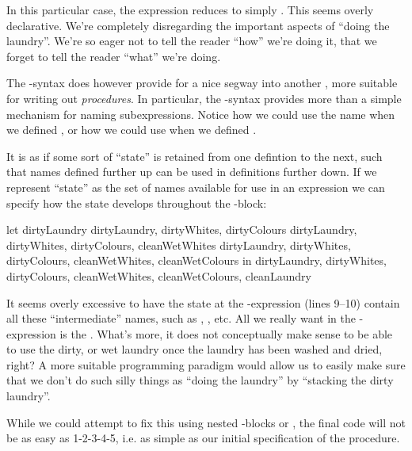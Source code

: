 In this particular case, the expression reduces to simply . This seems overly declarative. We're completely disregarding the
important aspects of ``doing the laundry''. We're so eager not to tell the
reader ``how'' we're doing it, that we forget to tell the reader ``what'' we're
doing.

The -syntax does however provide for a nice segway into another
, more suitable for writing out \emph{procedures}. In particular, the
-syntax provides more than a simple mechanism for naming
subexpressions. Notice how we could use the name  when we
defined , or how we could use  when we
defined .

It is as if some sort of ``state'' is retained from one defintion to the next,
such that names defined further up can be used in definitions further down. If
we represent ``state'' as the set of names available for use in an expression
we can specify how the state develops throughout the -block: 

\begin{code}
let
  {dirtyLaundry}
  {dirtyLaundry, dirtyWhites, dirtyColours}
  {dirtyLaundry, dirtyWhites, dirtyColours,
    cleanWetWhites}
  {dirtyLaundry, dirtyWhites, dirtyColours,
    cleanWetWhites, cleanWetColours}
in
  {dirtyLaundry, dirtyWhites, dirtyColours,
    cleanWetWhites, cleanWetColours, cleanLaundry}
\end{code}

It seems overly excessive to have the state at the -expression (lines
9--10) contain all these ``intermediate'' names, such as ,
, etc. All we really want in the -expression is
the . What's more, it does not conceptually make sense to be
able to use the dirty, or wet laundry once the laundry has been washed and
dried, right? A more suitable programming paradigm would allow us to easily
make sure that we don't do such silly things as ``doing the laundry'' by
``stacking the dirty laundry''.

While we could attempt to fix this using nested -blocks or
, the final code will not be as easy as
1-2-3-4-5, i.e. as simple as our initial specification of the procedure.

